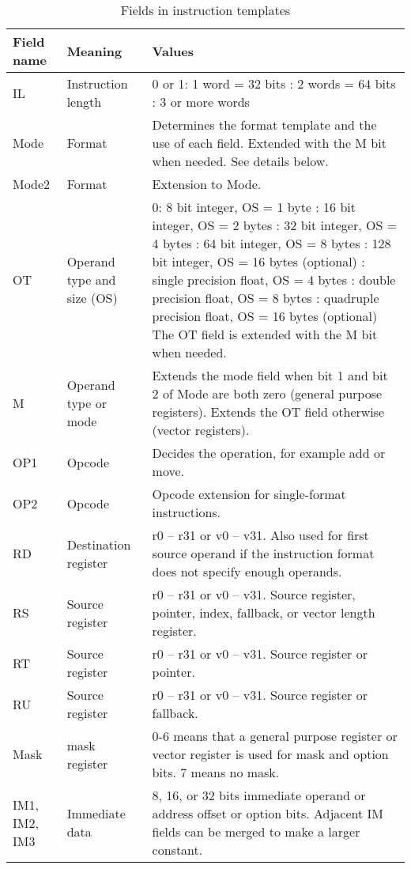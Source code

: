 \documentclass[forwardcom.tex]{subfiles}
\begin{document}
\begin{longtable} {|p{16mm}|p{16mm}|p{85mm}|}
\caption{Fields in instruction templates} \label{table:fieldsInTemplates} \\
\endfirsthead
\endhead
\hline
Field name & Meaning & Values  \\
\hline
IL & Instruction length & 0 or 1: 1 word = 32 bits \newline
2: 2 words = 64 bits \newline
3: 3 or more words  \\
\hline
Mode & Format & Determines the format template and the use of each field. 
Extended with the M bit when needed. \newline 
See details below. \\
\hline
Mode2 & Format & Extension to Mode. \\
\hline
OT & Operand type and size (OS) & 
0: 8 bit integer, OS = 1 byte  \newline
1: 16 bit integer, OS = 2 bytes \newline
2: 32 bit integer, OS = 4 bytes \newline
3: 64 bit integer, OS = 8 bytes \newline
4: 128 bit integer, OS = 16 bytes (optional) \newline
5: single precision float, OS = 4 bytes \newline
6: double precision float, OS = 8 bytes \newline
7: quadruple precision float, OS = 16 bytes (optional) \newline
The OT field is extended with the M bit when needed. \\
\hline
M & Operand type or mode & Extends the mode field when bit 1 and bit 2 of Mode are both zero (general purpose registers). Extends the OT field otherwise (vector registers).  \\
\hline
OP1 & Opcode & Decides the operation, for example add or move.  \\
\hline
OP2 & Opcode & Opcode extension for single-format instructions. \\
\hline
RD & Destination register & r0 – r31 or v0 – v31. Also used for first source operand if the instruction format does not specify enough operands. \\
\hline
RS & Source register & r0 – r31 or v0 – v31. Source register, pointer, index, fallback, or vector length register. \\
\hline
RT & Source register & r0 – r31 or v0 – v31. Source register or pointer.  \\
\hline
RU & Source register & r0 – r31 or v0 – v31. Source register or fallback. \\
\hline
Mask & mask register & 0-6 means that a general purpose register or vector register is used for mask and option bits. 7 means no mask.  \\
\hline
IM1, IM2, IM3 & Immediate data & 8, 16, or 32 bits immediate operand or address offset or option bits. Adjacent IM fields can be merged to make a larger constant. \\
\hline
\end{longtable}
\vspace{2mm}
\end{document}
